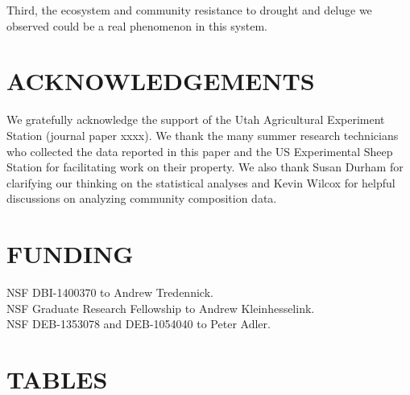 \documentclass[fleqn,10pt]{wlpeerj} %
\begin{document}
Third, the ecosystem and community resistance to drought and deluge we
observed could be a real phenomenon in this system.

\section{ACKNOWLEDGEMENTS}\label{acknowledgements}

We gratefully acknowledge the support of the Utah Agricultural
Experiment Station (journal paper xxxx). We thank the many summer
research technicians who collected the data reported in this paper and
the US Experimental Sheep Station for facilitating work on their
property. We also thank Susan Durham for clarifying our thinking on the
statistical analyses and Kevin Wilcox for helpful discussions on
analyzing community composition data.

\section{FUNDING}\label{funding}

NSF DBI-1400370 to Andrew Tredennick.\\
NSF Graduate Research Fellowship to Andrew Kleinhesselink.\\
NSF DEB-1353078 and DEB-1054040 to Peter Adler.

\newpage{}

\section{TABLES}\label{tables}
\end{document}
